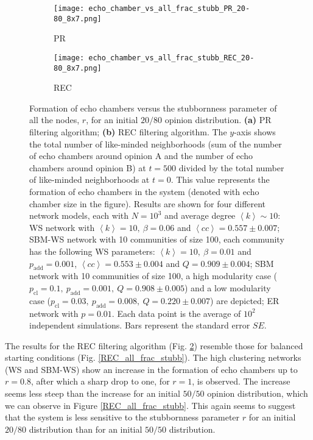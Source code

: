 \documentclass[11 pt , letterpaper , twoside , openright]{book}
\begin{document}
\begin{figure}[H]
  \begin{subfigure}[b]{0.49\textwidth}
    \caption{PR}
  	\texttt{[image: echo\_chamber\_vs\_all\_frac\_stubb\_PR\_20-80\_8x7.png]}
    \label{PR_all_frac_stubb_20-80}
  \end{subfigure}
  \begin{subfigure}[b]{0.49\textwidth}
    \caption{REC}
  	\texttt{[image: echo\_chamber\_vs\_all\_frac\_stubb\_REC\_20-80\_8x7.png]}
    \label{REC_all_frac_stubb_20-80}
  \end{subfigure}
  \captionsetup{format=plain}
  \caption[Formation of echo chambers versus the stubbornness parameter of all the nodes, $r$, for the PR and REC filtering algorithms and an initial $20/80$ opinion distribution.]{Formation of echo chambers versus the stubbornness parameter of all the nodes, $r$, for an initial $20/80$ opinion distribution. \textbf{(a)} PR filtering algorithm; \textbf{(b)} REC filtering algorithm. The $y$-axis shows the total number of like-minded neighborhoods (sum of the number of echo chambers around opinion A and the number of echo chambers around opinion B) at $t=500$ divided by the total number of like-minded neighborhoods at $t=0$. This value represents the formation of echo chambers in the system (denoted with echo chamber size in the figure). Results are shown for four different network models, each with $N=10^3$ and average degree $\left<k\right> \sim 10$: WS network with $\left<k\right> =10,\ \beta = 0.06$ and $\left<cc\right> = 0.557 \pm 0.007$; SBM-WS network with 10 communities of size 100, each community has the following WS parameters: $\left<k\right> = 10,\ \beta = 0.01$ and $p_{\text{add}} = 0.001$, $\left<cc\right> = 0.553 \pm 0.004$ and $Q = 0.909 \pm 0.004$; SBM network with 10 communities of size 100, a high modularity case ($p_{\text{cl}} = 0.1,\ p_{\text{add}} = 0.001,\ Q = 0.908 \pm 0.005$) and a low modularity case ($p_{\text{cl}} = 0.03,\ p_{\text{add}} = 0.008,\ Q = 0.220 \pm 0.007$) are depicted; ER network with $p= 0.01$. Each data point is the average of $10^2$ independent simulations. Bars represent the standard error $SE$.}
\label{echo_vs_all_frac_stubb_PR-REC_20-80}
\end{figure}
\noindent
The results for the REC filtering algorithm (Fig. \ref{REC_all_frac_stubb_20-80}) resemble those for balanced starting conditions (Fig. \ref{REC_all_frac_stubb}). The high clustering networks (WS and SBM-WS) show an increase in the formation of echo chambers up to $r=0.8$, after which a sharp drop to one, for $r=1$, is observed. The increase seems less steep than the increase for an initial $50/50$ opinion distribution, which we can observe in Figure \ref{REC_all_frac_stubb}. This again seems to suggest that the system is less sensitive to the stubbornness parameter $r$ for an initial $20/80$ distribution than for an initial $50/50$ distribution.\\
\end{document}
